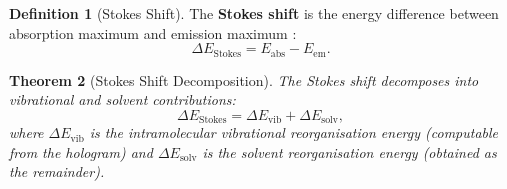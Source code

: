 \documentclass[11pt,twocolumn,a4paper]{article}
\newtheorem{theorem}{Theorem}[section]
\theoremstyle{definition}
\newtheorem{definition}[theorem]{Definition}
\theoremstyle{remark}
\begin{document}
\begin{definition}[Stokes Shift]
\label{def:stokes}
The \textbf{Stokes shift} is the energy difference between absorption maximum and emission maximum \citep{stokes1852}:
\begin{equation}
\Delta E_{\mathrm{Stokes}} = E_{\mathrm{abs}} - E_{\mathrm{em}}.
\end{equation}
\end{definition}

\begin{theorem}[Stokes Shift Decomposition]
\label{thm:stokes_decomp}
The Stokes shift decomposes into vibrational and solvent contributions:
\begin{equation}
\Delta E_{\mathrm{Stokes}} = \Delta E_{\mathrm{vib}} + \Delta E_{\mathrm{solv}},
\end{equation}
where $\Delta E_{\mathrm{vib}}$ is the intramolecular vibrational reorganisation energy (computable from the hologram) and $\Delta E_{\mathrm{solv}}$ is the solvent reorganisation energy (obtained as the remainder).
\end{theorem}
\end{document}
